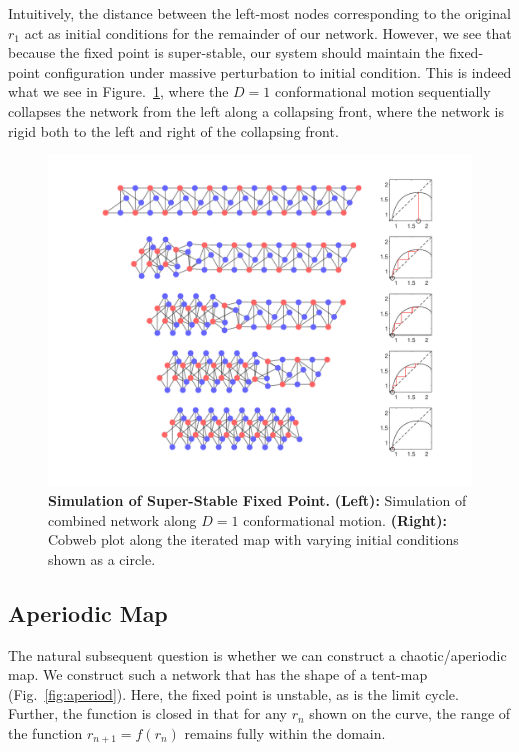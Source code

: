 \documentclass[12pt]{revtex4-1}
\begin{document}
Intuitively, the distance between the left-most nodes corresponding to the original $r_1$ act as initial conditions for the remainder of our network. However, we see that because the fixed point is super-stable, our system should maintain the fixed-point configuration under massive perturbation to initial condition. This is indeed what we see in Figure.~\ref{fig:fixed_point_sim}, where the $D=1$ conformational motion sequentially collapses the network from the left along a collapsing front, where the network is rigid both to the left and right of the collapsing front.

\begin{figure}[h!]
	\centering
	\includegraphics[width=1.0\columnwidth]{fixed_point_sim.pdf}
	\caption{\textbf{Simulation of Super-Stable Fixed Point.} \textbf{(Left):} Simulation of combined network along $D=1$ conformational motion. \textbf{(Right):} Cobweb plot along the iterated map with varying initial conditions shown as a circle.}
	\label{fig:fixed_point_sim}
\end{figure}

\subsection{Aperiodic Map}
The natural subsequent question is whether we can construct a chaotic/aperiodic map. We construct such a network that has the shape of a tent-map (Fig.~\ref{fig:aperiod}). Here, the fixed point is unstable, as is the limit cycle. Further, the function is closed in that for any $r_n$ shown on the curve, the range of the function $r_{n+1} = f(r_n)$ remains fully within the domain. 
\end{document}
